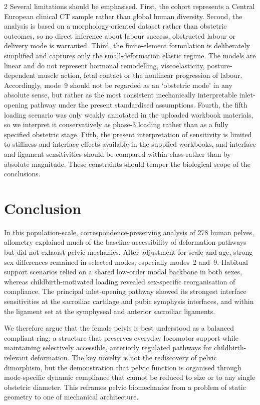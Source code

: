 \documentclass[openacc]{rsproca_new}
\begin{document}
\begin{multicols}{2}
Several limitations should be emphasised. First, the cohort represents a Central European clinical CT sample rather than global human diversity. Second, the analysis is based on a morphology-oriented dataset rather than obstetric outcomes, so no direct inference about labour success, obstructed labour or delivery mode is warranted. Third, the finite-element formulation is deliberately simplified and captures only the small-deformation elastic regime. The models are linear and do not represent hormonal remodelling, viscoelasticity, posture-dependent muscle action, fetal contact or the nonlinear progression of labour. Accordingly, mode~9 should not be regarded as an `obstetric mode' in any absolute sense, but rather as the most consistent mechanically interpretable inlet-opening pathway under the present standardised assumptions. Fourth, the fifth loading scenario was only weakly annotated in the uploaded workbook materials, so we interpret it conservatively as phase-3 loading rather than as a fully specified obstetric stage. Fifth, the present interpretation of sensitivity is limited to stiffness and interface effects available in the supplied workbooks, and interface and ligament sensitivities should be compared within class rather than by absolute magnitude. These constraints should temper the biological scope of the conclusions.

\section{Conclusion}

In this population-scale, correspondence-preserving analysis of 278 human pelves, allometry explained much of the baseline accessibility of deformation pathways but did not exhaust pelvic mechanics. After adjustment for scale and age, strong sex differences remained in selected modes, especially modes~2 and~9. Habitual support scenarios relied on a shared low-order modal backbone in both sexes, whereas childbirth-motivated loading revealed sex-specific reorganisation of compliance. The principal inlet-opening pathway showed its strongest interface sensitivities at the sacroiliac cartilage and pubic symphysis interfaces, and within the ligament set at the symphyseal and anterior sacroiliac ligaments.

We therefore argue that the female pelvis is best understood as a balanced compliant ring: a structure that preserves everyday locomotor support while maintaining selectively accessible, anteriorly regulated pathways for childbirth-relevant deformation. The key novelty is not the rediscovery of pelvic dimorphism, but the demonstration that pelvic function is organised through mode-specific dynamic compliance that cannot be reduced to size or to any single obstetric diameter. This reframes pelvic biomechanics from a problem of static geometry to one of mechanical architecture.


\end{multicols}
\end{document}
